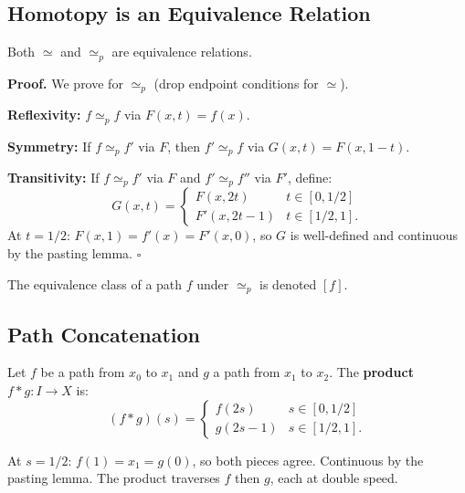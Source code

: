 \documentclass[11pt]{report}
\renewenvironment{proof}[1][Proof]{\noindent\textbf{#1.} }{\hfill$\square$\par\vspace{5pt}}
\begin{document}
\subsection{Homotopy is an Equivalence Relation}

\begin{lembox}
Both $\simeq$ and $\simeq_p$ are equivalence relations.
\end{lembox}

\begin{proof}
We prove for $\simeq_p$ (drop endpoint conditions for $\simeq$).

\textbf{Reflexivity:} $f \simeq_p f$ via $F(x, t) = f(x)$.

\textbf{Symmetry:} If $f \simeq_p f'$ via $F$, then $f' \simeq_p f$ via $G(x, t) = F(x, 1-t)$.

\textbf{Transitivity:} If $f \simeq_p f'$ via $F$ and $f' \simeq_p f''$ via $F'$, define:
\[G(x, t) = \begin{cases} F(x, 2t) & t \in [0, 1/2] \\ F'(x, 2t-1) & t \in [1/2, 1]. \end{cases}\]
At $t = 1/2$: $F(x,1) = f'(x) = F'(x,0)$, so $G$ is well-defined and continuous by the pasting lemma.
\end{proof}

\begin{defbox}
The equivalence class of a path $f$ under $\simeq_p$ is denoted $[f]$.
\end{defbox}

\subsection{Path Concatenation}

\begin{defbox}
Let $f$ be a path from $x_0$ to $x_1$ and $g$ a path from $x_1$ to $x_2$. The \textbf{product} $f * g: I \to X$ is:
\[(f * g)(s) = \begin{cases} f(2s) & s \in [0, 1/2] \\ g(2s-1) & s \in [1/2, 1]. \end{cases}\]
\end{defbox}

\begin{rembox}
At $s = 1/2$: $f(1) = x_1 = g(0)$, so both pieces agree. Continuous by the pasting lemma. The product traverses $f$ then $g$, each at double speed.
\end{rembox}
\end{document}
